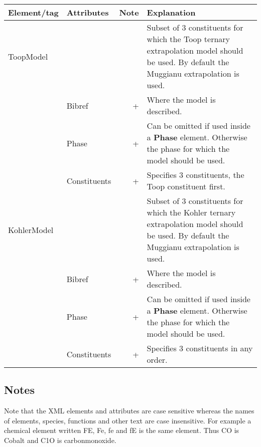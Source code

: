 \documentclass{article}
\begin{document}
\bigskip
\begin{tabular}{|p{} p{} r p{}|}\hline
  Element/tag & Attributes & Note & Explanation\\\hline

  ToopModel & & & Subset of 3 constituents for which the Toop ternary extrapolation model should be used.    By default the Muggianu extrapolation is used.\\
      & Bibref & + & Where the model is described.\\
      & Phase & + & Can be omitted if used inside a {\bf Phase} element.  Otherwise the phase for which the model should be used.\\
      & Constituents & + & Specifies 3 constituents, the Toop constituent first.\\\hline

  KohlerModel & &  & Subset of 3 constituents for which the Kohler ternary extrapolation model should be used.  By default the Muggianu extrapolation is used.\\
      & Bibref & + & Where the model is described.\\
      & Phase & + & Can be omitted if used inside a {\bf Phase} element.  Otherwise the phase for which the model should be used.\\
      & Constituents & + & Specifies 3 constituents in any order.\\\hline

\end{tabular}

\subsection{Notes}\label{sec:notes}

Note that the XML elements and attributes are case sensitive whereas
the names of elements, species, functions and other text are case
insensitive.  For example a chemical element written FE, Fe, fe and fE
is the same element.  Thus CO is Cobalt and C1O is carbonmonoxide.
\end{document}
